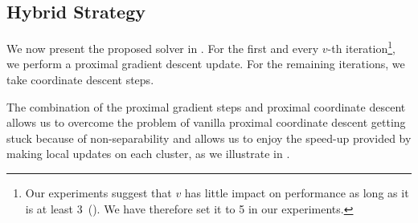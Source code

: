 \subsection{Hybrid Strategy}
\label{sec:hybrid-strategy}

We now present the proposed solver in .
For the first and every $v$-th iteration\footnote{Our experiments suggest that \(v\) has little impact on performance as long as it is at least 3~(). We have therefore set it to 5 in our experiments.}, we perform a proximal gradient descent update.
For the remaining iterations, we take coordinate descent steps.

The combination of the proximal gradient steps and proximal coordinate descent allows us to overcome the problem of vanilla proximal coordinate descent getting stuck because of non-separability and allows us to enjoy the speed-up provided by making local updates on each cluster, as we illustrate in .

\begin{algorithm}[hbt]
  \caption{%
    Hybrid coordinate descent and proximal gradient descent algorithm
    for SLOPE\label{alg:hybrid}}

  \Return{\(\beta\)}
\end{algorithm}

